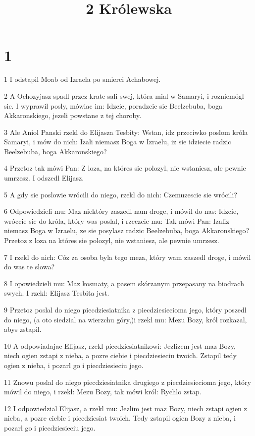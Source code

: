 

\title{2 Królewska}


\chapter{1}

\par 1 I odstapil Moab od Izraela po smierci Achabowej.
\par 2 A Ochozyjasz spadl przez krate sali swej, która mial w Samaryi, i rozniemógl sie. I wyprawil posly, mówiac im: Idzcie, poradzcie sie Beelzebuba, boga Akkaronskiego, jezeli powstane z tej choroby.
\par 3 Ale Aniol Panski rzekl do Elijasza Tesbity: Wstan, idz przeciwko poslom króla Samaryi, i mów do nich: Izali niemasz Boga w Izraelu, iz sie idziecie radzic Beelzebuba, boga Akkaronskiego?
\par 4 Przetoz tak mówi Pan: Z loza, na któres sie polozyl, nie wstaniesz, ale pewnie umrzesz. I odszedl Elijasz.
\par 5 A gdy sie poslowie wrócili do niego, rzekl do nich: Czemuzescie sie wrócili?
\par 6 Odpowiedzieli mu: Maz niektóry zaszedl nam droge, i mówil do nas: Idzcie, wróccie sie do króla, który was poslal, i rzeczcie mu: Tak mówi Pan: Izaliz niemasz Boga w Izraelu, ze sie posylasz radzic Beelzebuba, boga Akkaronskiego? Przetoz z loza na któres sie polozyl, nie wstaniesz, ale pewnie umrzesz.
\par 7 I rzekl do nich: Cóz za osoba byla tego meza, który wam zaszedl droge, i mówil do was te slowa?
\par 8 I opowiedzieli mu: Maz kosmaty, a pasem skórzanym przepasany na biodrach swych. I rzekl: Elijasz Tesbita jest.
\par 9 Przetoz poslal do niego piecdziesiatnika z piecdziesiecioma jego, który poszedl do niego, (a oto siedzial na wierzchu góry,)i rzekl mu: Mezu Bozy, król rozkazal, abys zstapil.
\par 10 A odpowiadajac Elijasz, rzekl piecdziesiatnikowi: Jezlizem jest maz Bozy, niech ogien zstapi z nieba, a pozre ciebie i piecdziesieciu twoich. Zstapil tedy ogien z nieba, i pozarl go i piecdziesieciu jego.
\par 11 Znowu poslal do niego piecdziesiatnika drugiego z piecdziesiecioma jego, który mówil do niego, i rzekl: Mezu Bozy, tak mówi król: Rychlo zstap.
\par 12 I odpowiedzial Elijasz, a rzekl mu: Jezlim jest maz Bozy, niech zstapi ogien z nieba, a pozre ciebie i piecdziesiat twoich. Tedy zstapil ogien Bozy z nieba, i pozarl go i piecdziesieciu jego.
